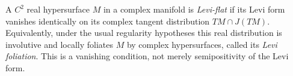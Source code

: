 
A $C^2$ real hypersurface $M$ in a complex manifold is \emph{Levi-flat} if its Levi form vanishes identically on its complex tangent distribution $TM\cap J(TM)$. Equivalently, under the usual regularity hypotheses this real distribution is involutive and locally foliates $M$ by complex hypersurfaces, called its \emph{Levi foliation}. This is a vanishing condition, not merely semipositivity of the Levi form.
